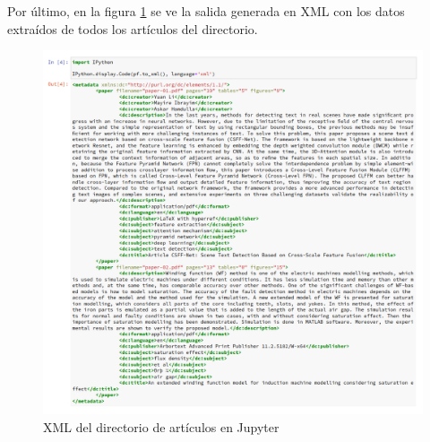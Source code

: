 \documentclass[../main.tex]{subfiles}
\begin{document}
Por último, en la figura \ref{fig:results-folder-xml} se ve la salida generada en XML con los datos extraídos de todos los artículos del directorio.

\begin{figure}[h]
	\centering
	\includegraphics[width=0.9\linewidth]{../images/results-folder-xml}
	\caption{XML del directorio de artículos en Jupyter}
	\label{fig:results-folder-xml}
\end{figure}
\end{document}
